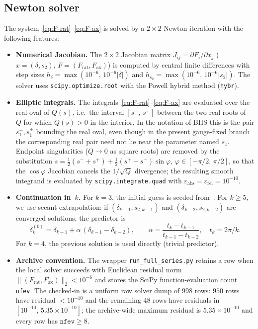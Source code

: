 \documentclass[11pt,a4paper]{article}
\theoremstyle{plain}
\theoremstyle{definition}
\theoremstyle{remark}
\newcommand{\abs}[1]{\lvert #1 \rvert}
\begin{document}
\subsection{Newton solver}\label{sec:newton}
The system~\eqref{eq:F-rat}--\eqref{eq:F-ax} is solved by a
$2 \times 2$ Newton iteration with the following features:
\begin{itemize}[nosep]
\item \textbf{Numerical Jacobian.}
  The $2 \times 2$ Jacobian matrix
  $J_{ij} = \partial F_i/\partial x_j$
  ($x = (\delta, s_2)$, $F = (F_{\mathrm{rat}}, F_{\mathrm{ax}})$)
  is computed by central finite differences with step sizes
  $h_{\delta} = \max(10^{-6},\, 10^{-6}\abs{\delta})$
  and $h_{s_2} = \max(10^{-6},\, 10^{-6}\abs{s_2})$.
  The solver uses \texttt{scipy.optimize.root} with the
  Powell hybrid method (\texttt{hybr}).
\item \textbf{Elliptic integrals.}
  The integrals~\eqref{eq:F-rat}--\eqref{eq:F-ax} are evaluated
  over the real oval of $Q(s)$, i.e.\ the interval
  $[s^-,\, s^+]$ between the two real roots of~$Q$ for which
  $Q(s) > 0$ in the interior.  In the notation of BHS this is the
  pair $s_1^-, s_1^+$ bounding the real oval, even though in the
  present gauge-fixed branch the corresponding real pair need not lie
  near the parameter named $s_1$.
  Endpoint singularities ($Q \to 0$ as square roots) are removed
  by the substitution $s = \tfrac12(s^- + s^+)
  + \tfrac12(s^+ - s^-)\sin\varphi$, $\varphi \in [-\pi/2,\,\pi/2]$,
  so that the $\cos\varphi$ Jacobian cancels the $1/\sqrt{Q}$
  divergence; the resulting smooth integrand is evaluated by
  \texttt{scipy.integrate.quad} with
  $\varepsilon_{\mathrm{abs}} = \varepsilon_{\mathrm{rel}} = 10^{-10}$.
\item \textbf{Continuation in~$k$.}
  For $k = 3$, the initial guess is seeded from~\cite{BHS25}.
  For $k \geq 5$, we use secant extrapolation: if
  $(\delta_{k-1}, s_{2,k-1})$ and $(\delta_{k-2}, s_{2,k-2})$ are
  converged solutions, the predictor is
  \[
    \delta_{k}^{(0)} = \delta_{k-1}
      + \alpha\,(\delta_{k-1} - \delta_{k-2}),
    \qquad
    \alpha = \frac{t_k - t_{k-1}}{t_{k-1} - t_{k-2}},
    \quad t_k = 2\pi/k.
  \]
  For $k = 4$, the previous solution is used directly (trivial
  predictor).
\item \textbf{Archive convention.}
  The wrapper \texttt{run\_full\_series.py} retains a row when the local
  solver succeeds with Euclidean residual norm
  $\|(F_{\mathrm{rat}},F_{\mathrm{ax}})\|_2 < 10^{-6}$ and stores the
  SciPy function-evaluation count \texttt{nfev}.  The checked-in
   is a uniform
  raw solver dump of $998$ rows: $950$ rows have residual
  $<10^{-10}$ and the remaining $48$ rows have residuals in
  $[10^{-10},\,5.35\times 10^{-10}]$; the archive-wide maximum residual
  is $5.35\times 10^{-10}$ and every row has $\texttt{nfev}\ge 8$.
\end{itemize}
\end{document}
